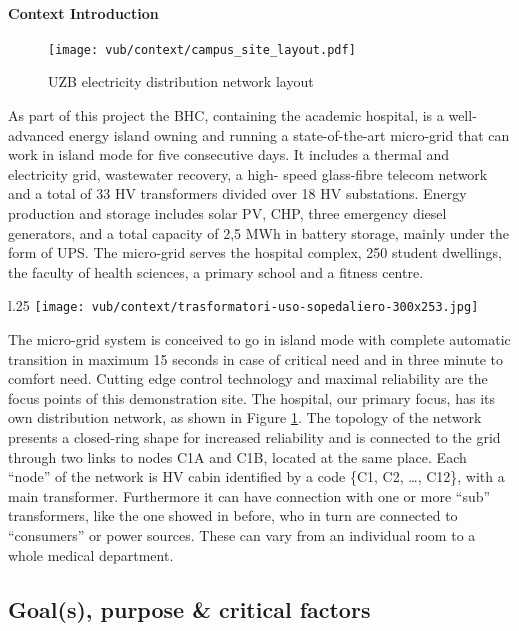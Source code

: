\paragraph{Context Introduction}
\begin{figure}[ht]
    \texttt{[image: vub/context/campus\_site\_layout.pdf]}
    \caption{\acs{UZB} electricity distribution network layout}
    \label{fig:bhc_site_layout}
\end{figure}
As part of this project the \ac{BHC}, containing the academic hospital, is a well-advanced
energy island owning and running a state-of-the-art micro-grid that can work in island mode for five consecutive days. 
It includes a thermal and electricity grid, wastewater recovery, a high-
speed glass-fibre telecom network and a total of 33 \ac{HV} transformers divided over 18 \ac{HV} substations.
Energy production and storage includes solar PV, \ac{CHP}, three emergency diesel generators,
and a total capacity of 2,5 MWh in battery storage, mainly under the form of UPS.
The micro-grid serves the hospital complex, 250 student dwellings, the faculty of health
sciences, a primary school and a fitness centre. 
\begin{wrapfigure}{l}{.25\textwidth}
    \centering
    \texttt{[image: vub/context/trasformatori-uso-sopedaliero-300x253.jpg]}
\end{wrapfigure}
The micro-grid system is conceived to go in island mode with complete automatic transition in maximum 15 seconds 
in case of critical need and in three minute to comfort need. 
Cutting edge control technology and maximal reliability are the focus points of this demonstration site.
The hospital, our primary focus, has its own distribution network, as shown in Figure \ref{fig:bhc_site_layout}.
The topology of the network presents a closed-ring shape for increased reliability and is connected to the grid 
through two links to nodes C1A and C1B, located at the same place. Each ``node'' of the network is \ac{HV} cabin identified by a code \{C1, C2, \dots, C12\}, with a main transformer.
Furthermore it can have connection with one or more ``sub'' transformers, like the one showed in before, 
who in turn are connected to ``consumers'' or power sources. These can vary from an individual room to a whole medical department.

\subsection{Goal(s), purpose \& critical factors}
